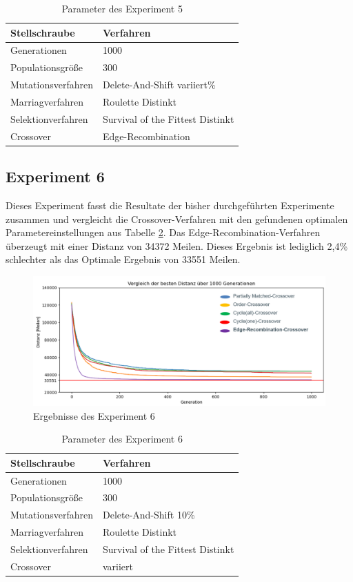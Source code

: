 \begin{table}[H]
\centering
\caption{Parameter des Experiment 5}
\begin{tabular}{ll}
Stellschraube & Verfahren \\
\hline
Generationen & 1000 \\
Populationsgröße & 300 \\
Mutationsverfahren & Delete-And-Shift variiert\% \\
Marriagverfahren & Roulette Distinkt \\
Selektionverfahren & Survival of the Fittest Distinkt \\
Crossover & Edge-Recombination
\end{tabular}
\label{tab:e5}
\end{table}

\subsection{Experiment 6}
Dieses Experiment fasst die Resultate der bisher durchgeführten Experimente zusammen und vergleicht die Crossover-Verfahren mit den gefundenen optimalen Parametereinstellungen aus Tabelle \ref{tab:e6}.
Das Edge-Recombination-Verfahren überzeugt mit einer Distanz von 34372 Meilen. Dieses Ergebnis ist lediglich 2,4\% schlechter als das Optimale Ergebnis von 33551 Meilen. 
\begin{figure}[H]
\centering
\includegraphics[width=1\textwidth]{img/Vortrag/experiment6.png}
\caption{Ergebnisse des Experiment 6}
\label{fig:experiment6}
\end{figure}

\begin{table}[H]
\centering
\caption{Parameter des Experiment 6}
\begin{tabular}{ll}
Stellschraube & Verfahren \\
\hline
Generationen & 1000 \\
Populationsgröße & 300 \\
Mutationsverfahren & Delete-And-Shift 10\% \\
Marriagverfahren & Roulette Distinkt \\
Selektionverfahren & Survival of the Fittest Distinkt \\
Crossover & variiert
\end{tabular}
\label{tab:e6}
\end{table}

